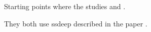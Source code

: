 \documentclass[../main.tex]{subfiles}
\begin{document}
Starting points where the studies  and .

They both use ssdeep\cite{ssdeep} described in the paper .
\end{document}
